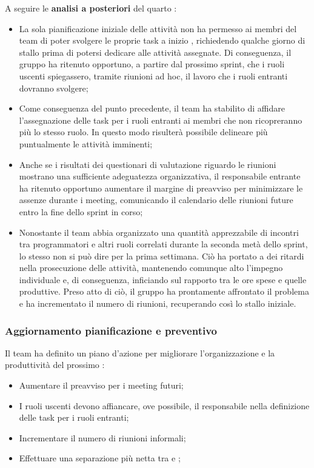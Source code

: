 \vspace{0.5\baselineskip}
\par A seguire le \textbf{analisi a posteriori} del quarto :
\begin{itemize}
  \item La sola pianificazione iniziale delle attività non ha permesso ai membri del team di poter svolgere le proprie task a inizio , richiedendo qualche giorno di stallo prima di potersi dedicare alle attività assegnate. Di conseguenza, il gruppo ha ritenuto opportuno, a partire dal prossimo sprint, che i ruoli uscenti spiegassero, tramite riunioni ad hoc, il lavoro che i ruoli entranti dovranno svolgere;
  \item Come conseguenza del punto precedente, il team ha stabilito di affidare l'assegnazione delle task per i ruoli entranti ai membri che non ricopreranno più lo stesso ruolo. In questo modo risulterà possibile delineare più puntualmente le attività imminenti;
  \item Anche se i risultati dei questionari di valutazione riguardo le riunioni mostrano una sufficiente adeguatezza organizzativa, il responsabile entrante ha ritenuto opportuno aumentare il margine di preavviso per minimizzare le assenze durante i meeting, comunicando il calendario delle riunioni future entro la fine dello sprint in corso;
  \item Nonostante il team abbia organizzato una quantità apprezzabile di incontri tra programmatori e altri ruoli correlati durante la seconda metà dello sprint, lo stesso non si può dire per la prima settimana. Ciò ha portato a dei ritardi nella prosecuzione delle attività, mantenendo comunque alto l'impegno individuale e, di conseguenza, inficiando sul rapporto tra le ore spese e quelle produttive. Preso atto di ciò, il gruppo ha prontamente affrontato il problema e ha incrementato il numero di riunioni, recuperando così lo stallo iniziale.
\end{itemize}

\subsubsection{Aggiornamento pianificazione e preventivo}
\par Il team ha definito un piano d'azione per migliorare l'organizzazione e la produttività del prossimo :
\begin{itemize}
  \item Aumentare il preavviso per i meeting futuri;
  \item I ruoli uscenti devono affiancare, ove possibile, il responsabile nella definizione delle task per i ruoli entranti;
  \item Incrementare il numero di riunioni informali;
  \item Effettuare una separazione più netta tra  e ;
\end{itemize}

